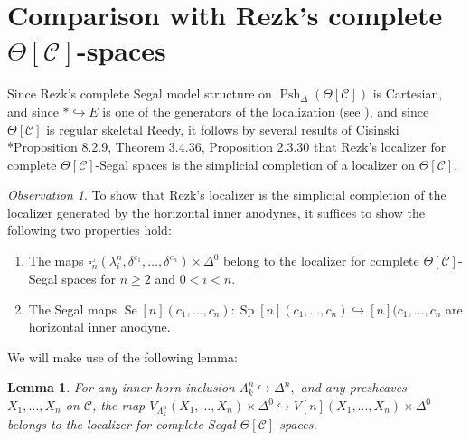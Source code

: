 \documentclass{amsart}
\numberwithin{equation}{section}
\theoremstyle{plain}   %
\newtheorem{lemma}[subsection]{Lemma}
\theoremstyle{remark}
\newtheorem{obs}[subsection]{Observation}
\theoremstyle{plain}
\DeclareMathOperator{\Psh}{Psh}
\newcommand{\C}{\ensuremath{\mathcal{C}}}
\begin{document}
\section{Comparison with Rezk's complete \(\Theta[\C]\)-spaces}\label{rezkcomparison}
Since Rezk's complete Segal model structure on \(\Psh_\Delta(\Theta[\C])\) is Cartesian, and since \(\ast \hookrightarrow E\) is one of the generators of the localization (see \cite{rezk-theta-n-spaces}), and since \(\Theta[\C]\) is regular skeletal Reedy, it follows by several results of Cisinski \cite{cisinski-book}*{Proposition 8.2.9, Theorem 3.4.36, Proposition 2.3.30} that Rezk's localizer for complete \(\Theta[\C]\)-Segal spaces is the simplicial completion of a localizer on \(\Theta[\C]\).  
\begin{obs}
	To show that Rezk's localizer is the simplicial completion of the localizer generated by the horizontal inner anodynes, it suffices to show the following two properties hold:
	\begin{enumerate}[\indent (i)] 
		\item The maps 
		\(\square_n^\lrcorner(\lambda^n_i,\delta^{c_1},\dots,\delta^{c_n})\times \Delta^0\) belong to the localizer for complete \(\Theta[\C]\)-Segal spaces for \(n\geq 2\) and \(0<i<n\).
		\item The Segal maps \(\operatorname{Se}[n](c_1,\dots,c_n): \operatorname{Sp}[n](c_1,\dots,c_n) \hookrightarrow [n](c_1,\dots,c_n\) are horizontal inner anodyne.
	\end{enumerate}
\end{obs}
We will make use of the following lemma:
\begin{lemma} 
	For any inner horn inclusion \(\Lambda^n_k\hookrightarrow \Delta^n,\) and any presheaves \(X_1,\dots,X_n\) on \(\C\), the map \(V_{\Lambda^n_k}(X_1,\dots,X_n)\times \Delta^0 \hookrightarrow V[n](X_1,\dots,X_n)\times \Delta^0\) belongs to the localizer for complete Segal-\(\Theta[\C]\)-spaces.
\end{lemma}
\end{document}

